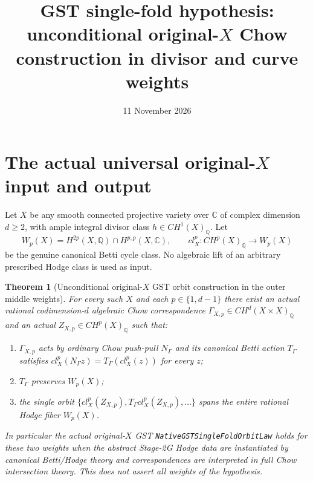 \documentclass[11pt]{article}
\title{GST single-fold hypothesis: unconditional original-$X$ Chow construction in divisor and curve weights}
\date{11 November 2026}
\newtheorem{theorem}{Theorem}
\begin{document}
\maketitle

\section{The actual universal original-$X$ input and output}
Let $X$ be any smooth connected projective variety over $\mathbb C$ of complex dimension $d\ge 2$, with ample integral divisor class $h\in CH^1(X)_{\mathbb Q}$.
Let
\[
W_p(X)=H^{2p}(X,\mathbb Q)\cap H^{p,p}(X,\mathbb C),
\qquad cl_X^p:CH^p(X)_{\mathbb Q}\longrightarrow W_p(X)
\]
be the genuine canonical Betti cycle class.
No algebraic lift of an arbitrary prescribed Hodge class is used as input.

\begin{theorem}[Unconditional original-$X$ GST orbit construction in the outer middle weights]
For every such $X$ and each $p\in\{1,d-1\}$ there exist an \emph{actual rational codimension-$d$ algebraic Chow correspondence}
$\Gamma_{X,p}\in CH^d(X\times X)_{\mathbb Q}$ and an actual
$Z_{X,p}\in CH^p(X)_{\mathbb Q}$ such that:
\begin{enumerate}
\item $\Gamma_{X,p}$ acts by ordinary Chow push-pull $N_{\Gamma}$ and its canonical Betti action $T_\Gamma$ satisfies
$cl_X^p(N_\Gamma z)=T_\Gamma(cl_X^p(z))$ for every $z$;
\item $T_\Gamma$ preserves $W_p(X)$;
\item the single orbit $\{cl_X^p(Z_{X,p}),T_\Gamma cl_X^p(Z_{X,p}),\ldots\}$ spans the entire rational Hodge fiber $W_p(X)$.
\end{enumerate}
In particular the \emph{actual original-$X$} GST
\texttt{NativeGSTSingleFoldOrbitLaw} holds for these two weights when the
abstract Stage-2G Hodge data are instantiated by canonical Betti/Hodge theory
and correspondences are interpreted in full Chow intersection theory.
This does not assert all weights of the hypothesis.
\end{theorem}
\end{document}

